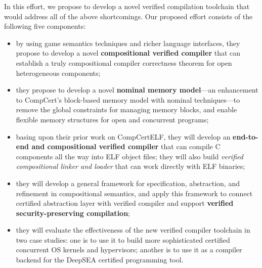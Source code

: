 In this effort, we propose to develop a novel verified compilation
toolchain that would address all of the above shortcomings. Our
proposed effort consists of the following five components:
\begin{itemize}
\item by using game semantics techniques and richer language interfaces,
they propose to develop a novel {\bf compositional verified compiler} that
can establish a truly compositional compiler correctness theorem for
open heterogeneous components;
\item they propose to develop a novel {\bf nominal memory model}---an
enhancement to CompCert's block-based memory model with nominal
techniques---to remove the global constraints for managing memory
blocks, and enable flexible memory structures for open and concurrent
programs;
\item basing upon their prior work on CompCertELF, they will develop an
{\bf end-to-end and compositional verified
compiler} that can compile C components all the way into ELF
object files; they will also build {\em verified compositional linker
and loader} that can work directly with ELF binaries;
\item they will develop a general
framework for specification, abstraction, and refinement in
compositional semantics, and apply this framework to connect
certified abstraction layer with verified compiler and support
{\bf verified security-preserving compilation};
\item they will evaluate the effectiveness of the new verified compiler
toolchain in two case studies: one is to use it to build more sophisticated
certified concurrent OS kernels and hypervisors; another is to
use it as a compiler backend for the DeepSEA certified programming tool.
\end{itemize}


